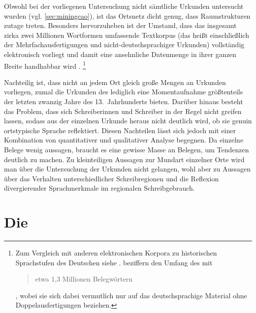 Obwohl bei der vorliegenen Untersuchung nicht sämtliche Urkunden untersucht
wurden (vgl. \cref{sec:miningcao}), ist das Ortsnetz dicht genug, dass
Raumstrukturen zutage treten. Besonders hervorzuheben ist der Umstand, dass das
insgesamt zirka zwei Millionen Wortformen umfassende Textkorpus (das heißt
einschließlich der Mehrfachausfertigungen und nicht-deutschsprachiger Urkunden)
vollständig elektronisch vorliegt \autocites{gniffkerapp2005}{cao-online} und
damit eine ansehnliche Datenmenge in ihrer ganzen Breite handhabbar wird
\autocite{beckerschallert2021,beckerschallert2022b}.%
%
	\footnote{Zum Vergleich mit anderen elektronischen Korpora zu historischen
	Sprachstufen des Deutschen siehe \citet{dipper2015}.
	\citet[391]{gniffkerapp2005} beziffern den Umfang des \CAO{} mit
	\blockquote{etwa 1,3 Millionen Belegwörtern}, wobei sie sich dabei
	vermutlich nur auf das deutschsprachige Material ohne Doppelausfertigungen
	beziehen.} %

Nachteilig ist, dass nicht an jedem Ort gleich große Mengen an Urkunden
vorliegen, zumal die Urkunden des \CAO{} lediglich eine Momentaufnahme
größtenteils der letzten zwanzig Jahre des 13.~Jahrhunderts bieten. Darüber
hinaus besteht das Problem, dass sich Schreiberinnen und Schreiber in der Regel
nicht greifen lassen, sodass aus der einzelnen Urkunde heraus nicht deutlich
wird, ob sie genuin ortstypische Sprache reflektiert. Diesen Nachteilen lässt
sich jedoch mit einer Kombination von quantitativer und qualitativer Analyse
begegnen. Da einzelne Belege wenig aussagen, braucht es eine gewisse Masse an
Belegen, um Tendenzen deutlich zu machen.
Zu kleinteiligen Aus\-sagen zur Mundart einzelner Orte wird man über die
Untersuchung der Urkunden nicht gelangen, wohl aber zu Aussagen über das
Verhalten unterschiedlicher Schreibregionen und die Reflexion divergierender
Sprachmerkmale im regionalen Schreibgebrauch.


\section[Die \tit{Kaiserchronik}]{Die }
\label{sec:materialkc}

